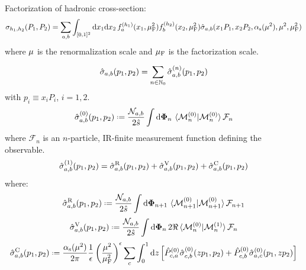
Factorization of hadronic cross-section:
\begin{equation*}
  \sigma_{h_1 , h_2}(P_1 , P_2) = \sum_{a,b} \int_{[0,1]^2} \mathrm{d} x_1 \mathrm{d} x_2 \, f_a^{(h_1)}(x_1, \mu_\text{F}^2) f_b^{(h_2)}(x_2, \mu_\text{F}^2) \hat{\sigma}_{a,b}(x_1 P_1, x_2 P_2, \alpha_\text{s}(\mu^2), \mu^2, \mu_\text{F}^2)
\end{equation*}
where $ \mu $ is the renormalization scale and $ \mu_\text{F} $ is the factorization scale.

\begin{equation}
  \hat{\sigma}_{a,b}(p_1 , p_2) = \sum_{n \in \mathbb{N}_0} \hat{\sigma}_{a,b}^{(n)}(p_1 , p_2)
\end{equation}
with $ p_i \equiv x_i P_i $, $ i = 1,2 $.
\begin{equation}
  \pcs_{a,b}^{(0)}(p_1 , p_2) \defeq \frac{\mathcal{N}_{a,b}}{2\hat{s}} \int \lps_n \, \braket{\me_n^{(0)} | \me_n^{(0)}} \mathcal{F}_n
\end{equation}
where $ \mathcal{F}_n $ is an $ n $-particle, IR-finite measurement function defining the observable.
\begin{equation}
  \hat{\sigma}_{a,b}^{(1)}(p_1 , p_2) = \hat{\sigma}_{a,b}^\text{R}(p_1 , p_2) + \hat{\sigma}_{a,b}^\text{V}(p_1 , p_2) + \hat{\sigma}_{a,b}^\text{C}(p_1 , p_2)
\end{equation}
where:
\begin{equation}
  \pcs_{a,b}^\text{R}(p_1 , p_2) \defeq \frac{\mathcal{N}_{a,b}}{2\hat{s}} \int \lps_{n+1} \, \braket{\me_{n+1}^{(0)} | \me_{n+1}^{(0)}} \mathcal{F}_{n+1}
\end{equation}
\begin{equation}
  \pcs_{a,b}^\text{V}(p_1 , p_2) \defeq \frac{\mathcal{N}_{a,b}}{2\hat{s}} \int \lps_n \, 2\Re \braket{\me_n^{(0)} | \me_n^{(1)}} \mathcal{F}_n
\end{equation}
\begin{equation}
  \pcs_{a,b}^\text{C}(p_1 , p_2) \defeq \frac{\rcr}{2\pi} \frac{1}{\de} \left( \frac{\ren^2}{\fac^2} \right)^\de \sum_c \int_0^1 \dd z \left[ \hat{P}_{c,a}^{(0)} \pcs_{c,b}^{(0)}(z p_1 , p_2) + \hat{P}_{c,b}^{(0)} \pcs_{a,c}^{(0)}(p_1 , z p_2) \right]
\end{equation}
